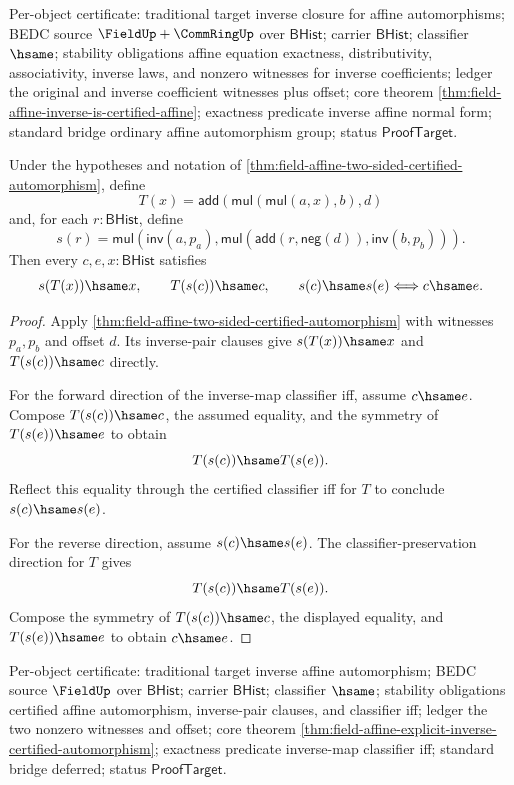 Per-object certificate: traditional target inverse closure for affine
automorphisms; BEDC source $\FieldUp+\CommRingUp$ over $\mathsf{BHist}$;
carrier $\mathsf{BHist}$; classifier $\hsame$; stability obligations affine
equation exactness, distributivity, associativity, inverse laws, and nonzero
witnesses for inverse coefficients; ledger the original and inverse coefficient
witnesses plus offset; core theorem
\autoref{thm:field-affine-inverse-is-certified-affine}; exactness predicate
inverse affine normal form; standard bridge ordinary affine automorphism group;
status $\mathsf{ProofTarget}$.

\begin{theorem}
\label{thm:field-affine-explicit-inverse-certified-automorphism}
Under the hypotheses and notation of
\autoref{thm:field-affine-two-sided-certified-automorphism}, define
$$
T(x)=\mathsf{add}(\mathsf{mul}(\mathsf{mul}(a,x),b),d)
$$
and, for each $r:\mathsf{BHist}$, define
$$
s(r)=
\mathsf{mul}(\mathsf{inv}(a,p_a),
\mathsf{mul}(\mathsf{add}(r,\mathsf{neg}(d)),\mathsf{inv}(b,p_b))).
$$
Then every $c,e,x:\mathsf{BHist}$ satisfies
$$
s(T(x))\hsame x,
\qquad
T(s(c))\hsame c,
\qquad
s(c)\hsame s(e)\Longleftrightarrow c\hsame e.
$$
\end{theorem}
\begin{proof}
Apply
\autoref{thm:field-affine-two-sided-certified-automorphism} with witnesses
$p_a,p_b$ and offset $d$. Its inverse-pair clauses give
$s(T(x))\hsame x$ and $T(s(c))\hsame c$ directly.

For the forward direction of the inverse-map classifier iff, assume
$c\hsame e$. Compose $T(s(c))\hsame c$, the assumed equality, and the symmetry
of $T(s(e))\hsame e$ to obtain
$$
T(s(c))\hsame T(s(e)).
$$
Reflect this equality through the certified classifier iff for $T$ to conclude
$s(c)\hsame s(e)$.

For the reverse direction, assume $s(c)\hsame s(e)$. The
classifier-preservation direction for $T$ gives
$$
T(s(c))\hsame T(s(e)).
$$
Compose the symmetry of $T(s(c))\hsame c$, the displayed equality, and
$T(s(e))\hsame e$ to obtain $c\hsame e$.
\end{proof}

Per-object certificate: traditional target inverse affine automorphism; BEDC
source $\FieldUp$ over $\mathsf{BHist}$; carrier $\mathsf{BHist}$; classifier
$\hsame$; stability obligations certified affine automorphism,
inverse-pair clauses, and classifier iff; ledger the two nonzero witnesses and
offset; core theorem
\autoref{thm:field-affine-explicit-inverse-certified-automorphism}; exactness
predicate inverse-map classifier iff; standard bridge deferred; status
$\mathsf{ProofTarget}$.

